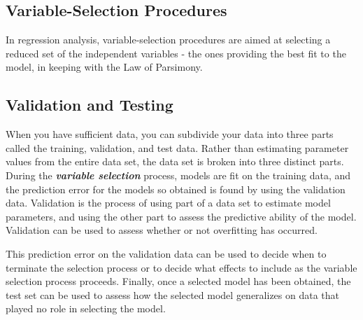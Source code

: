 \documentclass[a4paper,12pt]{article}
\begin{document}
\subsection{Variable-Selection Procedures}

In regression analysis, variable-selection procedures are aimed at selecting a reduced set of the independent variables - the ones providing the best fit to the model, in keeping with the Law of Parsimony.

\subsection{Validation and Testing}
When you have sufficient data, you can subdivide your data into three parts called the training, validation, and test data. Rather than estimating parameter values from the entire data set, the data set is broken into three distinct parts. During the \textbf{\textit{variable selection}} process, models are fit on the training data, and the prediction error for the models so obtained is found by using the validation data. Validation is the process of using part of a data set to estimate model parameters, and using the other part to assess the predictive ability of the model. Validation can be used to assess whether or not overfitting has occurred.

This prediction error on the validation data can be used to decide when to terminate the selection process or to decide what effects to include as the variable selection process proceeds. Finally, once a selected model has been obtained, the test set can be used to assess how the selected model generalizes on data that played no role in selecting the model.
\end{document}
